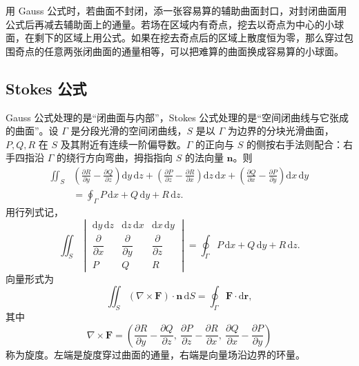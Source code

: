 用 Gauss 公式时，若曲面不封闭，添一张容易算的辅助曲面封口，对封闭曲面用公式后再减去辅助面上的通量。若场在区域内有奇点，挖去以奇点为中心的小球面，在剩下的区域上用公式。如果在挖去奇点后的区域上散度恒为零，那么穿过包围奇点的任意两张闭曲面的通量相等，可以把难算的曲面换成容易算的小球面。

\subsection{Stokes 公式}

Gauss 公式处理的是“闭曲面与内部”，Stokes 公式处理的是“空间闭曲线与它张成的曲面”。设 $\Gamma$ 是分段光滑的空间闭曲线，$S$ 是以 $\Gamma$ 为边界的分块光滑曲面，$P,Q,R$ 在 $S$ 及其附近有连续一阶偏导数。$\Gamma$ 的正向与 $S$ 的侧按右手法则配合：右手四指沿 $\Gamma$ 的绕行方向弯曲，拇指指向 $S$ 的法向量 $\mathbf n$。则
\[
    \begin{aligned}
    \iint_S&\left(\frac{\partial R}{\partial y}
    -\frac{\partial Q}{\partial z}\right)\mathrm dy\,\mathrm dz
    +\left(\frac{\partial P}{\partial z}
    -\frac{\partial R}{\partial x}\right)\mathrm dz\,\mathrm dx
    +\left(\frac{\partial Q}{\partial x}
    -\frac{\partial P}{\partial y}\right)\mathrm dx\,\mathrm dy\\
    &=\oint_\Gamma P\,\mathrm dx+Q\,\mathrm dy+R\,\mathrm dz .
    \end{aligned}
\]
用行列式记，
\[
    \iint_S
    \begin{vmatrix}
        \mathrm dy\,\mathrm dz & \mathrm dz\,\mathrm dx & \mathrm dx\,\mathrm dy\\
        \dfrac{\partial}{\partial x} & \dfrac{\partial}{\partial y} & \dfrac{\partial}{\partial z}\\
        P & Q & R
    \end{vmatrix}
    =\oint_\Gamma P\,\mathrm dx+Q\,\mathrm dy+R\,\mathrm dz .
\]
向量形式为
\[
    \iint_S(\nabla\times\mathbf F)\cdot\mathbf n\,\mathrm dS
    =\oint_\Gamma\mathbf F\cdot\mathrm d\mathbf r,
\]
其中
\[
    \nabla\times\mathbf F
    =\left(
    \frac{\partial R}{\partial y}-\frac{\partial Q}{\partial z},\
    \frac{\partial P}{\partial z}-\frac{\partial R}{\partial x},\
    \frac{\partial Q}{\partial x}-\frac{\partial P}{\partial y}
    \right)
\]
称为旋度。左端是旋度穿过曲面的通量，右端是向量场沿边界的环量。

